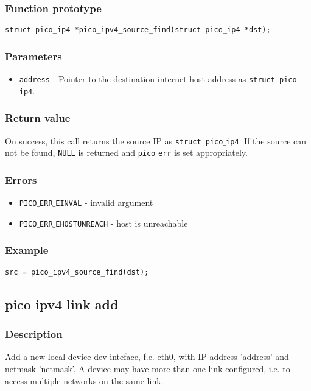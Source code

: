 \subsubsection*{Function prototype}
\begin{verbatim}
struct pico_ip4 *pico_ipv4_source_find(struct pico_ip4 *dst);
\end{verbatim}

\subsubsection*{Parameters}
\begin{itemize}[noitemsep]
\item \texttt{address} - Pointer to the destination internet host address as \texttt{struct pico$\_$ip4}.
\end{itemize}

\subsubsection*{Return value}
On success, this call returns the source IP as \texttt{struct pico$\_$ip4}.
If the source can not be found, \texttt{NULL} is returned and \texttt{pico$\_$err} is set appropriately.

\subsubsection*{Errors}
\begin{itemize}[noitemsep]
\item \texttt{PICO$\_$ERR$\_$EINVAL} - invalid argument
\item \texttt{PICO$\_$ERR$\_$EHOSTUNREACH} - host is unreachable
\end{itemize}

\subsubsection*{Example}
\begin{verbatim}
src = pico_ipv4_source_find(dst);
\end{verbatim}




\subsection{pico$\_$ipv4$\_$link$\_$add }

\subsubsection*{Description}
Add a new local device dev inteface, f.e. eth0, with IP address 'address' and netmask 'netmask'. A device may have more than one link configured, i.e. to access multiple networks on the same link.

